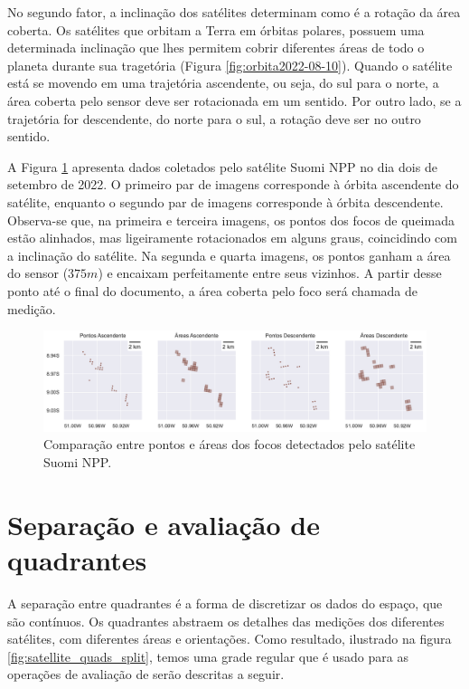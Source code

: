 \documentclass[cic,tc]{iiufrgs}
\begin{document}
No segundo fator, a inclinação dos satélites determinam como é a rotação da área coberta. Os satélites que orbitam a Terra em órbitas polares, possuem uma determinada inclinação que lhes permitem cobrir diferentes áreas de todo o planeta durante sua tragetória (Figura \ref{fig:orbita2022-08-10}). Quando o satélite está se movendo em uma trajetória ascendente, ou seja, do sul para o norte, a área coberta pelo sensor deve ser rotacionada em um sentido. Por outro lado, se a trajetória for descendente, do norte para o sul, a rotação deve ser no outro sentido.

A Figura \ref{fig:comparacao_pontos_e_areas} apresenta dados coletados pelo satélite  Suomi NPP no dia dois de setembro de 2022. O primeiro par de imagens corresponde à órbita ascendente do satélite, enquanto o segundo par de imagens corresponde à órbita descendente. Observa-se que, na primeira e terceira imagens, os pontos dos focos de queimada estão alinhados, mas ligeiramente rotacionados em alguns graus, coincidindo com a inclinação do satélite. Na segunda e quarta imagens, os pontos ganham a área do sensor ($375m$) e encaixam perfeitamente entre seus vizinhos. A partir desse ponto até o final do documento, a área coberta pelo foco será chamada de medição.

\begin{figure}[H]
    \caption{Comparação entre pontos e áreas dos focos detectados pelo satélite Suomi NPP.}
    \begin{center}
        \includegraphics[width=35em]{comparacao_pontos_e_areas}
    \end{center}
    \label{fig:comparacao_pontos_e_areas}
\end{figure}

\section{Separação e avaliação de quadrantes}
\label{sec:separacao_e_avaliacao}

A separação entre quadrantes é a forma de discretizar os dados do espaço, que são contínuos. Os quadrantes abstraem os detalhes das medições dos diferentes satélites, com diferentes áreas e orientações. Como resultado, ilustrado na figura \ref{fig:satellite_quads_split}, temos uma grade regular que é usado para as operações de avaliação de serão descritas a seguir. 
\end{document}
